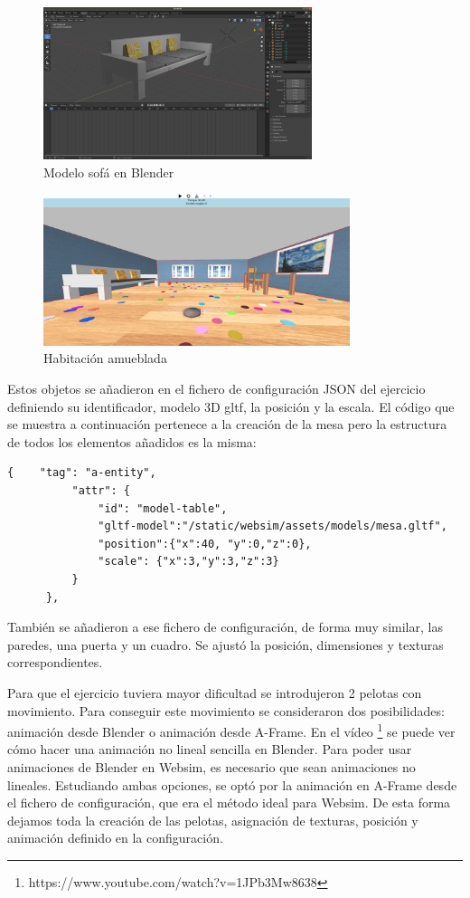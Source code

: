 \begin{figure}[H]
  \centering
 \includegraphics[width=0.7\textwidth]{chapters/images/sofa.png}
  \caption{Modelo sofá en Blender}
\end{figure}

\begin{figure}[H]
\centering
\includegraphics[width=0.8\textwidth, height=0.4\textwidth]{chapters/images/habitacioncon.png}
\caption{Habitación amueblada}
\end{figure}

Estos objetos se añadieron en el fichero de configuración JSON del ejercicio definiendo su identificador, modelo 3D gltf, la posición y la escala. El código que se muestra a continuación pertenece a la creación de la mesa pero la estructura  de todos los elementos añadidos es la misma: 
\begin{lstlisting}
{    "tag": "a-entity",
          "attr": {
              "id": "model-table",
              "gltf-model":"/static/websim/assets/models/mesa.gltf",
              "position":{"x":40, "y":0,"z":0},
              "scale": {"x":3,"y":3,"z":3}
          }
      },
\end{lstlisting}

También se añadieron a ese fichero de configuración, de forma muy similar, las paredes, una puerta y un cuadro. Se ajustó la posición, dimensiones y texturas correspondientes.

Para que el ejercicio tuviera mayor dificultad se introdujeron 2 pelotas con movimiento. Para conseguir este movimiento se consideraron dos posibilidades: animación desde Blender o animación desde A-Frame. 
En el vídeo \footnote{https://www.youtube.com/watch?v=1JPb3Mw8638}  se puede ver cómo hacer una animación no lineal sencilla en Blender. Para poder usar animaciones de Blender en Websim, es necesario que sean animaciones no lineales. Estudiando ambas opciones, se optó por la animación en A-Frame desde el fichero de configuración, que era el método ideal para Websim. De esta forma dejamos toda la creación de las pelotas, asignación de texturas, posición y  animación definido en la configuración.

